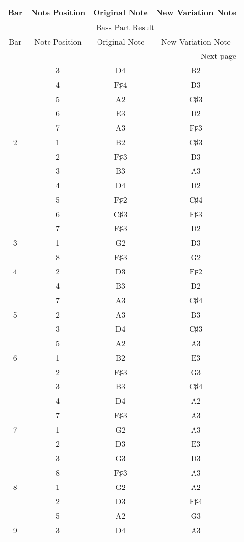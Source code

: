 \documentclass{article}
\begin{document}
\begin{longtable}{|c|c|c|c|}
\hline
Bar & Note Position & Original Note & New Variation Note \\ \hline
\endfirsthead
\multicolumn{4}{c}{{\tablename\ \thetable{} Bass Part Result}} \\
\hline
Bar & Note Position & Original Note & New Variation Note \\ \hline
\hline
\endhead
\hline
\multicolumn{4}{r}{Next page}
\endfoot
\hline
\endlastfoot
1 & 1 & D3 & B2 \\ 
  & 3 & D4 & B2 \\ 
  & 4 & F♯4 & D3 \\ 
  & 5 & A2 & C♯3 \\ 
  & 6 & E3 & D2 \\ 
  & 7 & A3 & F♯3 \\ 
\hline
2 & 1 & B2 & C♯3 \\ 
  & 2 & F♯3 & D3 \\ 
  & 3 & B3 & A3 \\ 
  & 4 & D4 & D2 \\ 
  & 5 & F♯2 & C♯4 \\ 
  & 6 & C♯3 & F♯3 \\ 
  & 7 & F♯3 & D2 \\ 
\hline
3 & 1 & G2 & D3 \\ 
  & 8 & F♯3 & G2 \\ 
\hline
4 & 2 & D3 & F♯2 \\ 
  & 4 & B3 & D2 \\ 
  & 7 & A3 & C♯4 \\ 
\hline
5 & 2 & A3 & B3 \\ 
  & 3 & D4 & C♯3 \\ 
  & 5 & A2 & A3 \\ 
\hline
6 & 1 & B2 & E3 \\ 
  & 2 & F♯3 & G3 \\ 
  & 3 & B3 & C♯4 \\ 
  & 4 & D4 & A2 \\ 
  & 7 & F♯3 & A3 \\ 
\hline
7 & 1 & G2 & A3 \\ 
  & 2 & D3 & E3 \\ 
  & 3 & G3 & D3 \\ 
  & 8 & F♯3 & A3 \\ 
\hline
8 & 1 & G2 & A2 \\ 
  & 2 & D3 & F♯4 \\ 
  & 5 & A2 & G3 \\ 
\hline
9 & 3 & D4 & A3 \\ 

\end{longtable}
\end{document}
